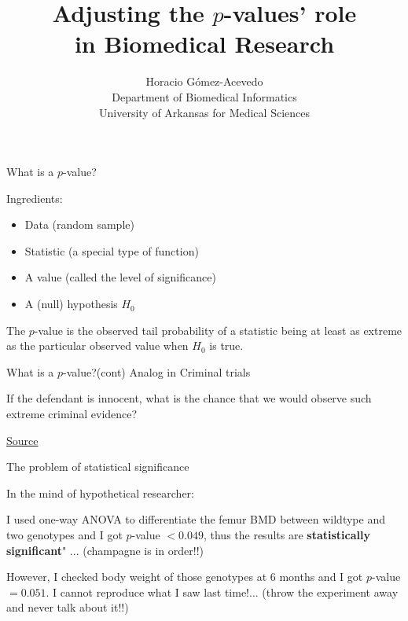 \documentclass{beamer}
\title{Adjusting the $p$-values' role \\  in Biomedical Research}
\author{Horacio G\'omez-Acevedo\\ Department of Biomedical Informatics\\
University of Arkansas for Medical Sciences}
\begin{document}
	\begin{frame}[plain]
		\maketitle
	\end{frame}
	\begin{frame}{What is a $p$-value?}
		
		Ingredients:
\begin{itemize}
	\item Data (random sample)
	\item Statistic (a special type of function)
	\item A value (called the level of significance)
	\item A (null) hypothesis $H_0$	
\end{itemize}		

\begin{definition}
	The $p$-value is the observed tail probability of a statistic being at least as extreme as the particular observed value when $H_0$ is true.
\end{definition}		
		
		
	

		
	\end{frame}

\begin{frame}{What is a $p$-value?(cont)}
	Analog in Criminal trials
	
	If the defendant is innocent, what is the chance that we would observe such extreme criminal evidence?

	
\href{https://newonlinecourses.science.psu.edu/statprogram/reviews/statistical-concepts/hypothesis-testing/p-value-approach}{Source}

\end{frame}
	



\begin{frame}{The problem of statistical significance}
	
In the mind of hypothetical researcher:

\begin{displayquote}
	I used one-way ANOVA to differentiate the femur BMD between wildtype and two genotypes and I got $p$-value $<0.049$, thus the results are \textbf{statistically significant}"  ... (champagne is in order!!) 
\end{displayquote}

\begin{displayquote}
However, I checked body weight of those genotypes at 6 months and I got $p$-value $= 0.051$. I cannot reproduce what I saw last time!... (throw the experiment away and never talk about it!!)
\end{displayquote}

\end{frame}
\end{document}
